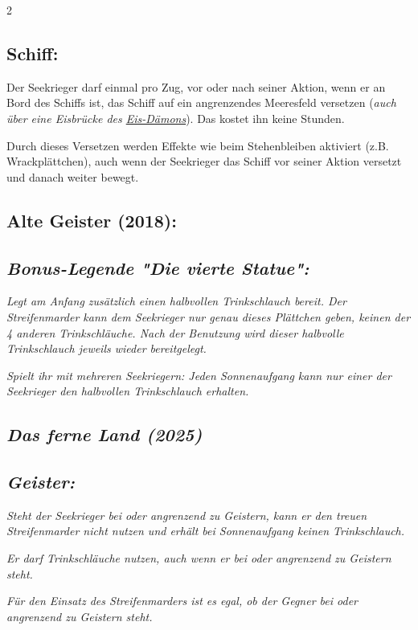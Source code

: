 \documentclass[10pt, a4paper, oneside]{book}
\newcommand{\fan}[1]{\textit{#1}}
\begin{document}
\begin{multicols*}{2}
\begin{bgcolor}
\subsection{Schiff:}

Der Seekrieger darf einmal pro Zug, vor oder nach seiner Aktion, wenn er an Bord des Schiffs ist, das Schiff auf ein angrenzendes Meeresfeld versetzen (\fan{auch über eine Eisbrücke des \hyperref[eis-daemon]{Eis-Dämons}}). Das kostet ihn keine Stunden.

Durch dieses Versetzen werden Effekte wie beim Stehenbleiben aktiviert (z.B. Wrackplättchen), auch wenn der Seekrieger das Schiff vor seiner Aktion versetzt und danach weiter bewegt.
\supercite{dridn-faq}

\end{bgcolor}


\begin{bgcolor}[color-ag]
\section{Alte Geister (2018):}



\subsection{\fan{Bonus-Legende "Die vierte Statue":}}

\fan{Legt am Anfang zusätzlich einen halbvollen Trinkschlauch bereit. Der Streifenmarder kann dem Seekrieger nur genau dieses Plättchen geben, keinen der 4 anderen Trinkschläuche. Nach der Benutzung wird dieser halbvolle Trinkschlauch jeweils wieder bereitgelegt.}

\fan{Spielt ihr mit mehreren Seekriegern: Jeden Sonnenaufgang kann nur einer der Seekrieger den halbvollen Trinkschlauch erhalten.}

\end{bgcolor}




\begin{bgcolor}
\section{\fan{Das ferne Land (2025)}}

\subsection{\fan{Geister:}}

\fan{Steht der Seekrieger bei oder angrenzend zu Geistern, kann er den treuen Streifenmarder nicht nutzen und erhält bei Sonnenaufgang keinen Trinkschlauch.}

\fan{Er darf Trinkschläuche nutzen, auch wenn er bei oder angrenzend zu Geistern steht.}

\fan{Für den Einsatz des Streifenmarders ist es egal, ob der Gegner bei oder angrenzend zu Geistern steht.} 


\end{bgcolor}



\end{multicols*}
\end{document}
